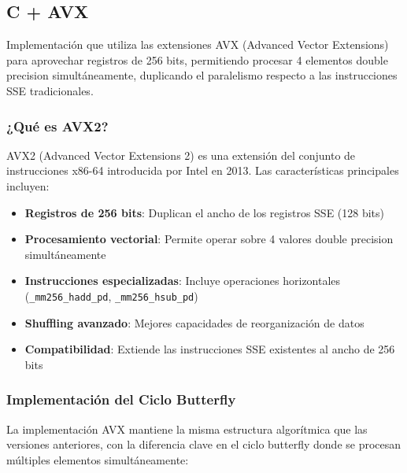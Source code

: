 \documentclass[a4paper]{article}
\begin{document}
\subsection{C + AVX}
Implementación que utiliza las extensiones AVX (Advanced Vector Extensions) para aprovechar registros de 256 bits, permitiendo procesar 4 elementos double precision simultáneamente,
duplicando el paralelismo respecto a las instrucciones SSE tradicionales.

\subsubsection{¿Qué es AVX2?}

AVX2 (Advanced Vector Extensions 2) es una extensión del conjunto de instrucciones x86-64 introducida por Intel en 2013. Las características principales incluyen:

\begin{itemize}
    \item \textbf{Registros de 256 bits}: Duplican el ancho de los registros SSE (128 bits)
    \item \textbf{Procesamiento vectorial}: Permite operar sobre 4 valores double precision simultáneamente
    \item \textbf{Instrucciones especializadas}: Incluye operaciones horizontales (\texttt{\_mm256\_hadd\_pd}, \texttt{\_mm256\_hsub\_pd})
    \item \textbf{Shuffling avanzado}: Mejores capacidades de reorganización de datos
    \item \textbf{Compatibilidad}: Extiende las instrucciones SSE existentes al ancho de 256 bits
\end{itemize}

\subsubsection{Implementación del Ciclo Butterfly}

La implementación AVX mantiene la misma estructura algorítmica que las versiones anteriores, con la diferencia clave en el ciclo butterfly donde se procesan múltiples elementos simultáneamente:
\end{document}
